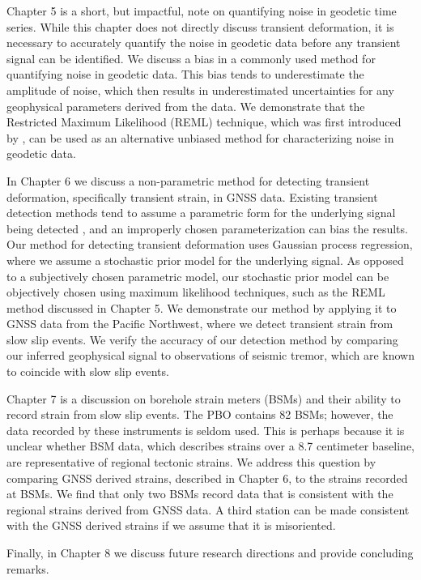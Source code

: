 Chapter 5 is a short, but impactful, note on quantifying noise in geodetic time series.  While this chapter does not directly discuss transient deformation, it is necessary to accurately quantify the noise in geodetic data before any transient signal can be identified. We discuss a bias in a commonly used method for quantifying noise in geodetic data. This bias tends to underestimate the amplitude of noise, which then results in underestimated uncertainties for any geophysical parameters derived from the data. We demonstrate that the Restricted Maximum Likelihood (REML) technique, which was first introduced by \citet{Patterson1971}, can be used as an alternative unbiased method for characterizing noise in geodetic data.

In Chapter 6 we discuss a non-parametric method for detecting transient deformation, specifically transient strain, in GNSS data. Existing transient detection methods tend to assume a parametric form for the underlying signal being detected \citep[e.g.,][]{Ohtani2010}, and an improperly chosen parameterization can bias the results. Our method for detecting transient deformation uses Gaussian process regression, where we assume a stochastic prior model for the underlying signal. As opposed to a subjectively chosen parametric model, our stochastic prior model can be objectively chosen using maximum likelihood techniques, such as the REML method discussed in Chapter 5. We demonstrate our method by applying it to GNSS data from the Pacific Northwest, where we detect transient strain from slow slip events. We verify the accuracy of our detection method by comparing our inferred geophysical signal to observations of seismic tremor, which are known to coincide with slow slip events.       

Chapter 7 is a discussion on borehole strain meters (BSMs) and their ability to record strain from slow slip events. The PBO contains 82 BSMs; however, the data recorded by these instruments is seldom used. This is perhaps because it is unclear whether BSM data, which describes strains over a 8.7 centimeter baseline, are representative of regional tectonic strains. We address this question by comparing GNSS derived strains, described in Chapter 6, to the strains recorded at BSMs. We find that only two BSMs record data that is consistent with the regional strains derived from GNSS data. A third station can be made consistent with the GNSS derived strains if we assume that it is misoriented.

Finally, in Chapter 8 we discuss future research directions and provide concluding remarks.                 

